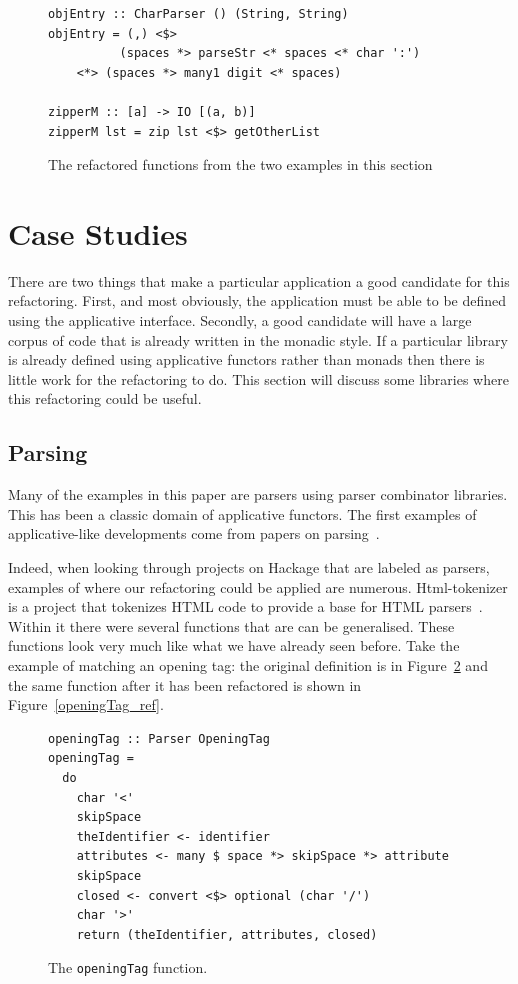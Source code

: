 \begin{figure}[t]
\begin{lstlisting}
objEntry :: CharParser () (String, String)
objEntry = (,) <$> 
		  (spaces *> parseStr <* spaces <* char ':') 
	<*> (spaces *> many1 digit <* spaces)

zipperM :: [a] -> IO [(a, b)]
zipperM lst = zip lst <$> getOtherList
\end{lstlisting}
\caption{The refactored functions from the two examples in this section}
\label{final-fns}
\end{figure}

\section{Case Studies}
\label{sec:appApps}

There are two things that make a particular application a good candidate for this refactoring. First, and most obviously, the application must be able to be defined using the applicative interface. Secondly, a good candidate will have a large corpus of code that is already written in the monadic style. If a particular library is already defined using applicative functors rather than monads then there is little work for the refactoring to do.
This section will discuss some libraries where this refactoring could be useful.

\subsection{Parsing}
Many of the examples in this paper are parsers using parser combinator libraries. This has been a classic domain of applicative functors. The first examples of applicative-like developments come from papers on parsing~\citep{efficientParsing,errParsers}.

Indeed, when looking through projects on Hackage that are labeled as parsers, examples of where our refactoring could be applied are numerous. Html-tokenizer is a project that tokenizes HTML code to provide a base for HTML parsers~\citep{htmlTok}. Within it there were several functions that are can be generalised. These functions look very much like what we have already seen before. Take the example of matching an opening tag: the original definition is in Figure~\ref{openingTag} and the same function after it has been refactored is shown in Figure~\ref{openingTag_ref}.

\begin{figure}[t]
\begin{lstlisting}
openingTag :: Parser OpeningTag
openingTag =
  do
    char '<'
    skipSpace
    theIdentifier <- identifier
    attributes <- many $ space *> skipSpace *> attribute
    skipSpace
    closed <- convert <$> optional (char '/')
    char '>'
    return (theIdentifier, attributes, closed)
\end{lstlisting}
\caption{The \texttt{openingTag} function.}
\label{openingTag}
\end{figure}

